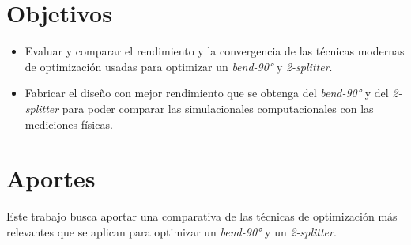 \section{Objetivos}

\begin{itemize}

  \item Evaluar y comparar el rendimiento y la convergencia de las técnicas modernas de optimización usadas para optimizar un \emph{bend-90°} y \emph{2-splitter}.

  \item Fabricar el diseño con mejor rendimiento que se obtenga del \emph{bend-90°} y del \emph{2-splitter} para poder comparar las simulacionales computacionales con las mediciones físicas.


\end{itemize}



\section{Aportes}

Este trabajo busca aportar una comparativa de las técnicas de optimización más relevantes que se aplican para optimizar un \emph{bend-90°} y un \emph{2-splitter}.
